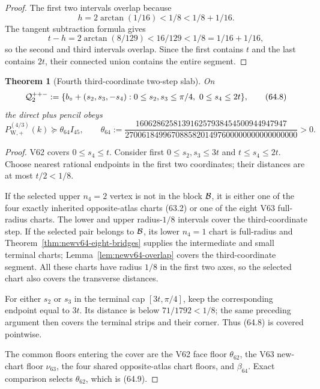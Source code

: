 \documentclass[11pt,oneside]{article}
\newtheorem{theorem}{Theorem}[section]
\theoremstyle{definition}
\theoremstyle{remark}
\begin{document}
\begin{proof}
The first two intervals overlap because
\[
 h=2\arctan(1/16)<1/8<1/8+1/16.                     \tag{64.6}
\]
The tangent subtraction formula gives
\[
 t-h=2\arctan(8/129)<16/129<1/8=1/16+1/16,          \tag{64.7}
\]
so the second and third intervals overlap.  Since the first
contains \(t\) and the last contains \(2t\), their connected union
contains the entire segment.
\end{proof}

\begin{theorem}[Fourth third-coordinate two-step slab]
\label{thm:newv64-third-two-step}
On
\[
 {\cal Q}^{++-}_{2}:=
 \{b_\circ+(s_2,s_3,-s_4):
 0\le s_2,s_3\le\pi/4,\ 0\le s_4\le2t\},             \tag{64.8}
\]
the direct plus pencil obeys
\[
 P_{\mathrm W,+}^{(4/3)}(k)
 \succeq\theta_{64}I_{45},\qquad
 \theta_{64}:=
 \frac{160628625813916257938454500944947947}
 {27006184996708858201497600000000000000000}>0.       \tag{64.9}
\]
\end{theorem}

\begin{proof}
V62 covers \(0\le s_4\le t\).  Consider first
\(0\le s_2,s_3\le3t\) and \(t\le s_4\le2t\).  Choose nearest
rational endpoints in the first two coordinates; their distances
are at most \(t/2<1/8\).

If the selected upper \(n_4=2\) vertex is not in the block
\({\cal B}\), it is either one of the four exactly inherited
opposite-atlas charts (63.2) or one of the eight V63 full-radius
charts.  The lower and upper radius-\(1/8\) intervals cover the
third-coordinate step.  If the selected pair belongs to
\({\cal B}\), its lower \(n_4=1\) chart is full-radius and
Theorem~\ref{thm:newv64-eight-bridges} supplies the intermediate
and small terminal charts; Lemma~\ref{lem:newv64-overlap} covers
the third-coordinate segment.  All these charts have radius
\(1/8\) in the first two axes, so the selected chart also covers
the transverse distances.

For either \(s_2\) or \(s_3\) in the terminal cap
\([3t,\pi/4]\), keep the corresponding endpoint equal to \(3t\).
Its distance is below \(71/1792<1/8\); the same preceding argument
then covers the terminal strips and their corner.  Thus (64.8) is
covered pointwise.

The common floors entering the cover are the V62 face floor
\(\theta_{62}\), the V63 new-chart floor \(\nu_{63}\), the four
shared opposite-atlas chart floors, and \(\beta_{64}\).  Exact
comparison selects \(\theta_{62}\), which is (64.9).
\end{proof}
\end{document}
